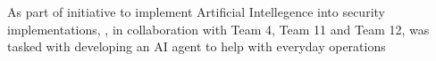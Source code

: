 







\newpage


 \label{sec:deepfakeVideoExample}

As part of \clientP initiative to implement Artificial Intellegence into security implementations, \team, in collaboration with Team 4, Team 11 and Team 12, was tasked with developing an AI agent to help with everyday operations

